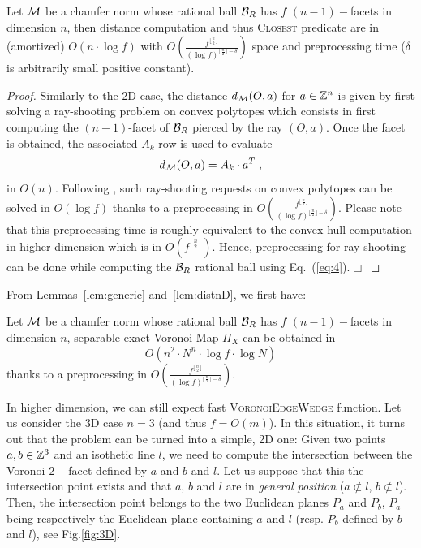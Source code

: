 \documentclass{llncs}
\begin{document}
\begin{lemma}
\label{lem:distnD}
   Let $\mathcal{M}$ be a chamfer norm whose rational ball $\mathcal{B}_R$ has $f$
   $(n-1)-$facets in dimension $n$, then distance computation and thus
   \textsc{Closest} predicate are in (amortized) $O(n\cdot\log{f})$ with
   $O\left (\frac{f^{\lfloor \frac{n}{2}\rfloor}}{(\log{ f})^{\lfloor
       \frac{n}{2}\rfloor-\delta}}\right)$ space and preprocessing
   time ($\delta$ is arbitrarily small positive constant).
\end{lemma}
\begin{proof}
 Similarly to the 2D case, the distance $d_{\mathcal{M}}(O,a)$ for $a\in{\mathbb{Z}}^n$ is
 given by first solving a ray-shooting problem on convex polytopes
 which consists in first computing the $(n-1)$-facet of $\mathcal{B}_R$ pierced by the
 ray $(O,a)$. Once the facet is obtained, the associated $A_k$ row is
 used to evaluate
 \begin{displaymath}
   d_{\mathcal{M}}(O,a) = A_k\cdot a^T\;,
 \end{displaymath}
in $O(n)$.  Following \cite{DBLP:journals/dcg/MatousekS93}, such
ray-shooting requests on convex polytopes can be solved in
$O(\log{f})$ thanks to a preprocessing in $O\left (\frac{f^{\lfloor
    \frac{n}{2}\rfloor}}{(\log{ f})^{\lfloor
    \frac{n}{2}\rfloor-\delta}}\right)$. Please note that this
preprocessing time is roughly equivalent to the convex hull
computation in higher dimension which is in $O(f^{\lfloor
  \frac{n}{2}\rfloor})$. Hence, preprocessing for ray-shooting can be
done while computing the $\mathcal{B}_R$ rational ball using
Eq.~(\ref{eq:4}).$\Box$
\end{proof}

From Lemmas~\ref{lem:generic} and~\ref{lem:distnD}, we first have:
\begin{corollary}
\label{coro2}
   Let $\mathcal{M}$ be a chamfer norm whose rational ball $\mathcal{B}_R$ has $f$
   $(n-1)-$facets in dimension $n$, separable exact Voronoi Map
   $\Pi_X$ can be obtained in
   \begin{equation}
     O(n^2\cdot N^n\cdot \log{f}\cdot\log{N})
   \end{equation}
thanks to a preprocessing in $O\left (\frac{f^{\lfloor
    \frac{n}{2}\rfloor}}{(\log{ f})^{\lfloor
    \frac{n}{2}\rfloor-\delta}}\right)$.
\end{corollary}


In higher dimension, we can still expect fast
\textsc{VoronoiEdgeWedge} function. Let us consider the 3D case
$n=3$ (and thus $f=O(m)$). In this situation, it turns out that the problem can be turned
into a simple, 2D one: Given two points $a,b\in{\mathbb{Z}}^3$ and an isothetic
line $l$, we need to compute the intersection between the Voronoi
$2-$facet defined by $a$ and $b$ and $l$. Let us suppose that this the
intersection point exists and that $a$, $b$ and $l$ are in
\emph{general position} ($a\not\subset l$, $b\not\subset l$).  Then,
the intersection point belongs to the two Euclidean planes $P_a$ and
$P_b$, $P_a$ being respectively the Euclidean plane containing $a$ and
$l$ (resp. $P_b$ defined by $b$ and $l$), see Fig.\ref{fig:3D}.
\end{document}
